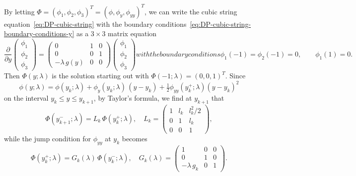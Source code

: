 \documentclass[10pt,a4paper]{article} \pdfoutput=1 
\begin{document}
By letting
$\Phi = (\phi_1,\phi_2,\phi_3)^T = (\phi,\phi_y,\phi_{yy})^T$,
we can write the cubic string equation~\eqref{eq:DP-cubic-string}
with the boundary conditions~\eqref{eq:DP-cubic-string-boundary-conditions-y}
as a $3 \times 3$ matrix equation
\begin{subequations}
  \label{eq:DP-cubic-string-matrix}
\begin{equation}
  \label{eq:DP-cubic-string-matrix-ODE}
  \frac{\partial}{\partial y}
  \begin{pmatrix} \phi_1 \\ \phi_2 \\ \phi_3 \end{pmatrix}
  =
  \begin{pmatrix}
    0 & 1 & 0 \\
    0 & 0 & 1 \\
    -\lambda \, g(y) & 0 & 0
  \end{pmatrix}
  \begin{pmatrix} \phi_1 \\ \phi_2 \\ \phi_3 \end{pmatrix}
\end{equation}
with the boundary conditions
\begin{equation}
  \label{eq:DP-cubic-string-matrix-boundary-conditions-y}
  \phi_1(-1) = \phi_2(-1) = 0
  ,
  \qquad
  \phi_1(1) = 0
  .
\end{equation}
\end{subequations}
Then $\Phi(y;\lambda)$ is the solution starting out with $\Phi(-1;\lambda) = (0,0,1)^T$.
Since
\begin{equation*}
  \phi(y;\lambda) = \phi(y_k;\lambda) + \phi_y(y_k;\lambda) \, (y-y_k) + \tfrac12 \phi_{yy}(y_k^+;\lambda) (y-y_k)^2
\end{equation*}
on the interval $y_k \le y \le y_{k+1}$, by Taylor's formula,
we find at $y_{k+1}$ that
\begin{equation}
  \label{eq:DP-Lk}
  \Phi(y_{k+1}^-;\lambda) = L_k \, \Phi(y_{k}^+;\lambda)
  ,\quad
  L_k =
  \begin{pmatrix}
    1 & l_k & l_k^2/2 \\
    0 & 1 & l_k \\
    0 & 0 & 1
  \end{pmatrix}
  ,
\end{equation}
while the jump condition for $\phi_{yy}$ at $y_k$ becomes
\begin{equation}
  \label{eq:DP-Gk}
  \Phi(y_k^+;\lambda) = G_k(\lambda) \, \Phi(y_k^-;\lambda)
  ,\quad
  G_k(\lambda) =
  \begin{pmatrix}
    1 & 0 & 0 \\
    0 & 1 & 0 \\
    -\lambda\,g_k & 0 & 1
  \end{pmatrix}
  .
\end{equation}
\end{document}
